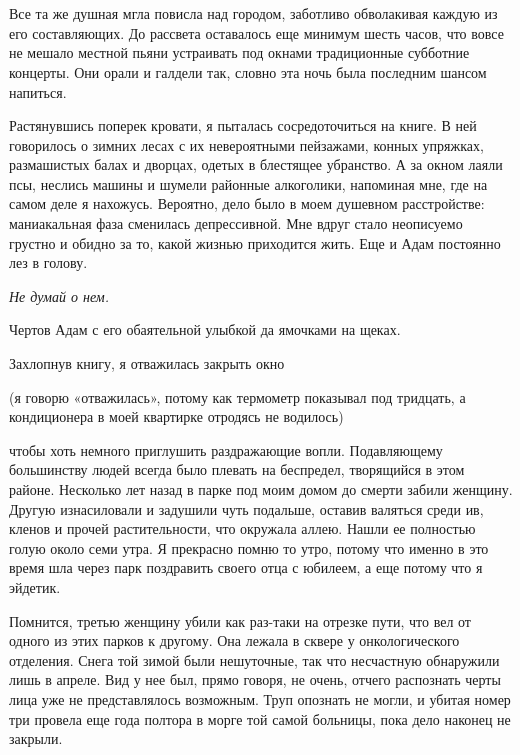 \documentclass[
]{book}
\begin{document}
\hypertarget{chapter-3}{%
\chapter{~}\label{chapter-3}}

Все та же душная мгла повисла над городом, заботливо обволакивая каждую из его составляющих. До рассвета оставалось еще минимум шесть часов, что вовсе не мешало местной пьяни устраивать под окнами традиционные субботние концерты. Они орали и галдели так, словно эта ночь была последним шансом напиться.

Растянувшись поперек кровати, я пыталась сосредоточиться на книге. В ней говорилось о зимних лесах с их невероятными пейзажами, конных упряжках, размашистых балах и дворцах, одетых в блестящее убранство. А за окном лаяли псы, неслись машины и шумели районные алкоголики, напоминая мне, где на самом деле я нахожусь. Вероятно, дело было в моем душевном расстройстве: маниакальная фаза сменилась депрессивной. Мне вдруг стало неописуемо грустно и обидно за то, какой жизнью приходится жить. Еще и Адам постоянно лез в голову.

\emph{Не думай о нем.}

Чертов Адам с его обаятельной улыбкой да ямочками на щеках.

Захлопнув книгу, я отважилась закрыть окно

(я говорю «отважилась», потому как термометр показывал под тридцать, а кондиционера в моей квартирке отродясь не водилось)

чтобы хоть немного приглушить раздражающие вопли. Подавляющему большинству людей всегда было плевать на беспредел, творящийся в этом районе. Несколько лет назад в парке под моим домом до смерти забили женщину. Другую изнасиловали и задушили чуть подальше, оставив валяться среди ив, кленов и прочей растительности, что окружала аллею. Нашли ее полностью голую около семи утра. Я прекрасно помню то утро, потому что именно в это время шла через парк поздравить своего отца с юбилеем, а еще потому что я эйдетик.

Помнится, третью женщину убили как раз-таки на отрезке пути, что вел от одного из этих парков к другому. Она лежала в сквере у онкологического отделения. Снега той зимой были нешуточные, так что несчастную обнаружили лишь в апреле. Вид у нее был, прямо говоря, не очень, отчего распознать черты лица уже не представлялось возможным. Труп опознать не могли, и убитая номер три провела еще года полтора в морге той самой больницы, пока дело наконец не закрыли.
\end{document}
